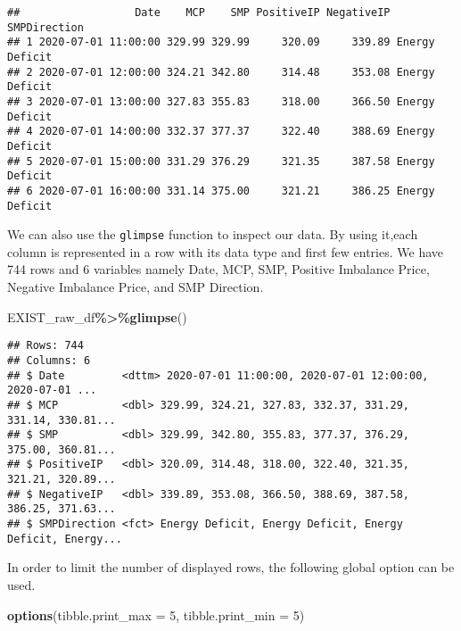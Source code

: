 \documentclass[
]{article}
\newenvironment{Shaded}{\begin{snugshade}}{\end{snugshade}}
\newcommand{\DataTypeTok}[1]{\textcolor[rgb]{0.13,0.29,0.53}{#1}}
\newcommand{\DecValTok}[1]{\textcolor[rgb]{0.00,0.00,0.81}{#1}}
\newcommand{\KeywordTok}[1]{\textcolor[rgb]{0.13,0.29,0.53}{\textbf{#1}}}
\newcommand{\NormalTok}[1]{#1}
\newcommand{\OperatorTok}[1]{\textcolor[rgb]{0.81,0.36,0.00}{\textbf{#1}}}
\begin{document}
\begin{verbatim}
##                  Date    MCP    SMP PositiveIP NegativeIP   SMPDirection
## 1 2020-07-01 11:00:00 329.99 329.99     320.09     339.89 Energy Deficit
## 2 2020-07-01 12:00:00 324.21 342.80     314.48     353.08 Energy Deficit
## 3 2020-07-01 13:00:00 327.83 355.83     318.00     366.50 Energy Deficit
## 4 2020-07-01 14:00:00 332.37 377.37     322.40     388.69 Energy Deficit
## 5 2020-07-01 15:00:00 331.29 376.29     321.35     387.58 Energy Deficit
## 6 2020-07-01 16:00:00 331.14 375.00     321.21     386.25 Energy Deficit
\end{verbatim}

We can also use the \texttt{glimpse} function to inspect our data. By
using it,each column is represented in a row with its data type and
first few entries. We have 744 rows and 6 variables namely Date, MCP,
SMP, Positive Imbalance Price, Negative Imbalance Price, and SMP
Direction.

\begin{Shaded}
\begin{Highlighting}[]
\NormalTok{EXIST\_raw\_df}\OperatorTok{\%\textgreater{}\%}\KeywordTok{glimpse}\NormalTok{()}
\end{Highlighting}
\end{Shaded}

\begin{verbatim}
## Rows: 744
## Columns: 6
## $ Date         <dttm> 2020-07-01 11:00:00, 2020-07-01 12:00:00, 2020-07-01 ...
## $ MCP          <dbl> 329.99, 324.21, 327.83, 332.37, 331.29, 331.14, 330.81...
## $ SMP          <dbl> 329.99, 342.80, 355.83, 377.37, 376.29, 375.00, 360.81...
## $ PositiveIP   <dbl> 320.09, 314.48, 318.00, 322.40, 321.35, 321.21, 320.89...
## $ NegativeIP   <dbl> 339.89, 353.08, 366.50, 388.69, 387.58, 386.25, 371.63...
## $ SMPDirection <fct> Energy Deficit, Energy Deficit, Energy Deficit, Energy...
\end{verbatim}

In order to limit the number of displayed rows, the following global
option can be used.

\begin{Shaded}
\begin{Highlighting}[]
\KeywordTok{options}\NormalTok{(}\DataTypeTok{tibble.print\_max =} \DecValTok{5}\NormalTok{, }\DataTypeTok{tibble.print\_min =} \DecValTok{5}\NormalTok{)}
\end{Highlighting}
\end{Shaded}
\end{document}
